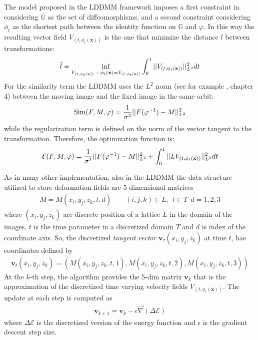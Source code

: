 The model proposed in the LDDMM framework imposes a first constraint in considering $\mathbb{G}$ as the set of diffeomorphisms, and a second constraint considering $\phi_{t}$ as the shortest path between the identity function on $\mathbb{G}$ and $\varphi$. In this way the resulting vector field $V_{(t,\phi_{t} (\mathbf{x}))}$ is the one that minimize the distance $l$ between transformations:
\begin{align*}
\hat{l} = \inf_{V_{(t,\phi_{t} (\mathbf{x}))} ~ : ~ \dot{\phi_{t}} (\mathbf{x}) = V_{(t,\phi_{t} (\mathbf{x}))}  
				       }
	\int_{0}^{1} \vert\lvert V_{(t,\phi_{t} (\mathbf{x}))} \rvert\vert_{L^2}^{2}dt
\end{align*}
For the similarity term the LDDMM uses the $L^{2}$ norm (see for example \cite{stein2009real}, chapter 4) between the moving image and the fixed image in the same orbit:
\begin{align*}
\text{Sim}(F,M,\varphi) = \frac{1}{\sigma^2}\vert\lvert F(\varphi^{-1})  - M   \rvert\vert_{L^{2}}^{2}
\end{align*}
while the regularization term is defined on the norm of the vector tangent to the transformation. Therefore, the optimization function is: 
\begin{align*}
\mathcal{E}(F, M, \varphi) 
= 
\frac{1}{\sigma^2}\vert\lvert F(\varphi^{-1})  - M   \rvert\vert_{L^{2}}^{2}
 +
\int_0^1 \vert\lvert L V_{(t,\phi_{t} (\mathbf{x}))}  \rvert\vert_{L^{2}}^{2} dt
\end{align*}

As in many other implementation, also in the LDDMM the data structure utilized to store deformation fields are 5-dimensional matrices
\begin{align}\label{eq:basic_data_structure}
M = M(x_i,y_j,z_k,t,d) \qquad (i,j,k)\in L , ~~ t \in T  ~~ d = 1,2,3
\end{align}
where $(x_i,y_j,z_k)$ are discrete position of a lattice $L$ in the domain of the images, $t$ is the time parameter in a discretized domain $T$ and $d$ is index of the coordinate axis. So, the discretized \emph{tangent vector} $\mathbf{v}_{\tau}(x_i,y_j,z_k)$ at time $t$, has coordinates defined by
\begin{align*}
\mathbf{v}_{t}(x_i,y_j,z_k) = (M(x_i,y_j,z_k,t ,1), M(x_i,y_j,z_k,t,2), M(x_i,y_j,z_k,t ,3))
\end{align*}
At the $k$-th step, the algorithm provides the 5-dim matrix $\mathbf{v}_{k}$ that is the approximation of the discretized time varying velocity fields $V_{(t,\phi_{t} (\mathbf{x}))}$. The update at each step is computed as
\begin{align*}
\mathbf{v}_{k+1} = \mathbf{v}_{k} - \epsilon \vec{\nabla} (\Delta\mathcal{E})
\end{align*}
where $\Delta\mathcal{E}$ is the discretized version of the energy function and $\epsilon$ is the gradient descent step size.

